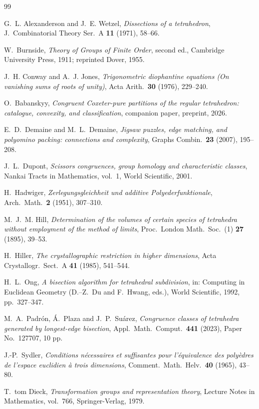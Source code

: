 \documentclass[11pt,a4paper]{article}
\theoremstyle{plain}
\theoremstyle{definition}
\theoremstyle{remark}
\begin{document}
\begin{thebibliography}{99}

G.~L. Alexanderson and J.~E. Wetzel,
\emph{Dissections of a tetrahedron},
J.\ Combinatorial Theory Ser.\ A \textbf{11} (1971), 58--66.

W.~Burnside,
\emph{Theory of Groups of Finite Order},
second ed., Cambridge University Press, 1911; reprinted Dover, 1955.

J.~H. Conway and A.~J. Jones,
\emph{Trigonometric diophantine equations (On vanishing sums of roots of unity)},
Acta Arith.\ \textbf{30} (1976), 229--240.

O.~Babanskyy,
\emph{Congruent Coxeter-pure partitions of the regular tetrahedron:
catalogue, convexity, and classification},
companion paper, preprint, 2026.

E.~D.\ Demaine and M.~L.\ Demaine,
\emph{Jigsaw puzzles, edge matching, and polyomino packing: connections and
complexity},
Graphs Combin.\ \textbf{23} (2007), 195--208.

J.~L.\ Dupont,
\emph{Scissors congruences, group homology and characteristic classes},
Nankai Tracts in Mathematics, vol.~1, World Scientific, 2001.

H.~Hadwiger,
\emph{Zerlegungsgleichheit und additive Polyederfunktionale},
Arch.\ Math.\ \textbf{2} (1951), 307--310.

M.~J.~M. Hill,
\emph{Determination of the volumes of certain species of tetrahedra
without employment of the method of limits},
Proc.\ London Math.\ Soc.\ (1) \textbf{27} (1895), 39--53.

H.~Hiller,
\emph{The crystallographic restriction in higher dimensions},
Acta Crystallogr.\ Sect.\ A \textbf{41} (1985), 541--544.

H.~L.\ Ong,
\emph{A bisection algorithm for tetrahedral subdivision},
in: Computing in Euclidean Geometry (D.--Z.\ Du and F.\ Hwang, eds.),
World Scientific, 1992, pp.~327--347.

M.~A.\ Padr\'on, \'A.\ Plaza and J.~P.\ Su\'arez,
\emph{Congruence classes of tetrahedra generated by longest-edge bisection},
Appl.\ Math.\ Comput.\ \textbf{441} (2023), Paper No.\ 127707, 10 pp.

J.-P.\ Sydler,
\emph{Conditions n\'ecessaires et suffisantes pour l'\'equivalence des
poly\`edres de l'espace euclidien \`a trois dimensions},
Comment.\ Math.\ Helv.\ \textbf{40} (1965), 43--80.

T.~tom Dieck,
\emph{Transformation groups and representation theory},
Lecture Notes in Mathematics, vol.~766, Springer-Verlag, 1979.

\end{thebibliography}
\end{document}
